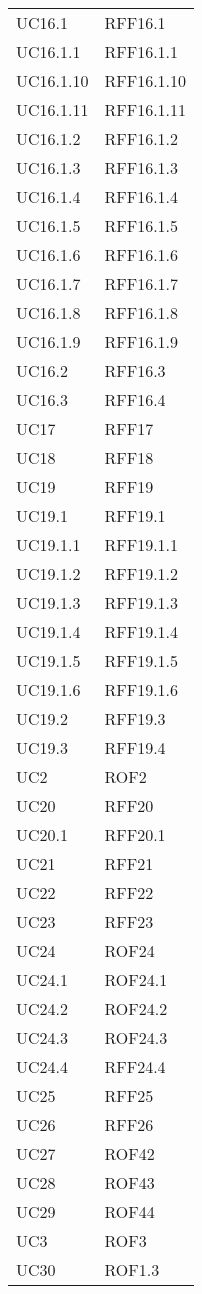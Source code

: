\begin{longtable}{p{2.5cm}!{\VRule[1pt]}p{2.5cm}}
	UC16.1 & RFF16.1\\
	UC16.1.1 & RFF16.1.1\\
	UC16.1.10 & RFF16.1.10\\
	UC16.1.11 & RFF16.1.11\\
	UC16.1.2 & RFF16.1.2\\
	UC16.1.3 & RFF16.1.3\\
	UC16.1.4 & RFF16.1.4\\
	UC16.1.5 & RFF16.1.5\\
	UC16.1.6 & RFF16.1.6\\
	UC16.1.7 & RFF16.1.7\\
	UC16.1.8 & RFF16.1.8\\
	UC16.1.9 & RFF16.1.9\\
	UC16.2 & RFF16.3\\
	UC16.3 & RFF16.4\\
	UC17 & RFF17\\
	UC18 & RFF18\\
	UC19 & RFF19\\
	UC19.1 & RFF19.1\\
	UC19.1.1 & RFF19.1.1\\
	UC19.1.2 & RFF19.1.2\\
	UC19.1.3 & RFF19.1.3\\
	UC19.1.4 & RFF19.1.4\\
	UC19.1.5 & RFF19.1.5\\
	UC19.1.6 & RFF19.1.6\\
	UC19.2 & RFF19.3\\
	UC19.3 & RFF19.4\\
	UC2 & ROF2\\
	UC20 & RFF20\\
	UC20.1 & RFF20.1\\
	UC21 & RFF21\\
	UC22 & RFF22\\
	UC23 & RFF23\\
	UC24 & ROF24\\
	UC24.1 & ROF24.1\\
	UC24.2 & ROF24.2\\
	UC24.3 & ROF24.3\\
	UC24.4 & RFF24.4\\
	UC25 & RFF25\\
	UC26 & RFF26\\
	UC27 & ROF42\\
	UC28 & ROF43\\
	UC29 & ROF44\\
	UC3 & ROF3\\
	UC30 & ROF1.3\\

\end{longtable}
